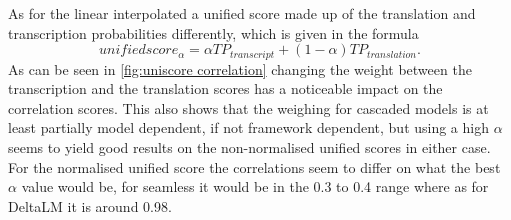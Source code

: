 As for the linear interpolated a unified score made up of the translation and transcription probabilities differently, which is given in the formula $$unifiedscore_\alpha= \alpha TP_{transcript} + (1-\alpha)TP_{translation}.$$ 
As can be seen in \autoref{fig:uniscore correlation} changing the weight between the transcription and the translation scores has a noticeable impact on the correlation scores. 
This also shows that the weighing for cascaded models is at least partially model dependent, if not framework dependent, but using a high $\alpha$ seems to yield good results on the non-normalised unified scores in either case. 
For the normalised unified score the correlations seem to differ on what the best $\alpha$ value would be, for seamless it would be in the 0.3 to 0.4 range where as for DeltaLM it is around 0.98. 

